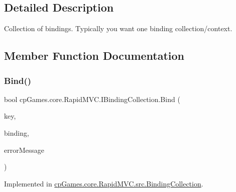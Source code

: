 \subsection{Detailed Description}
Collection of bindings. Typically you want one binding collection/context. 



\subsection{Member Function Documentation}
\mbox{\label{interfacecp_games_1_1core_1_1_rapid_m_v_c_1_1_i_binding_collection_afff4c2ad2ff9fb25c906864bc28f036f}} 
\subsubsection{\texorpdfstring{Bind()}{Bind()}}
{\footnotesize\ttfamily bool cp\+Games.\+core.\+Rapid\+M\+V\+C.\+I\+Binding\+Collection.\+Bind (\begin{DoxyParamCaption}\item[{\mbox{\hyperlink{interfacecp_games_1_1core_1_1_rapid_m_v_c_1_1_i_binding_key}{I\+Binding\+Key}}}]{key,  }\item[{out \mbox{\hyperlink{interfacecp_games_1_1core_1_1_rapid_m_v_c_1_1_i_binding}{I\+Binding}}}]{binding,  }\item[{out string}]{error\+Message }\end{DoxyParamCaption})}



Implemented in \mbox{\hyperlink{classcp_games_1_1core_1_1_rapid_m_v_c_1_1src_1_1_binding_collection_a766bda0a58edf276bb1eaf3185fa6317}{cp\+Games.\+core.\+Rapid\+M\+V\+C.\+src.\+Binding\+Collection}}.

\mbox{\label{interfacecp_games_1_1core_1_1_rapid_m_v_c_1_1_i_binding_collection_a2a468c5570b780133763d9592e2c1cb5}} 
